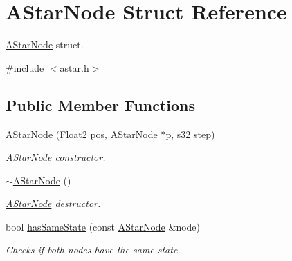 \hypertarget{struct_a_star_node}{}\section{A\+Star\+Node Struct Reference}
\label{struct_a_star_node}


\mbox{\hyperlink{struct_a_star_node}{A\+Star\+Node}} struct.  




{\ttfamily \#include $<$astar.\+h$>$}

\subsection*{Public Member Functions}
\begin{DoxyCompactItemize}
\item 
\mbox{\hyperlink{struct_a_star_node_a83855bd19999236fe103de45eed4fe35}{A\+Star\+Node}} (\mbox{\hyperlink{class_float2}{Float2}} pos, \mbox{\hyperlink{struct_a_star_node}{A\+Star\+Node}} $\ast$p, s32 step)
\begin{DoxyCompactList}\small\item\em \mbox{\hyperlink{struct_a_star_node}{A\+Star\+Node}} constructor. \end{DoxyCompactList}\item 
\mbox{\hyperlink{struct_a_star_node_a5d0ea0d3912a227675c5bc9d1deb2ca6}{$\sim$\+A\+Star\+Node}} ()
\begin{DoxyCompactList}\small\item\em \mbox{\hyperlink{struct_a_star_node}{A\+Star\+Node}} destructor. \end{DoxyCompactList}\item 
bool \mbox{\hyperlink{struct_a_star_node_a25645a980664aa05e56e4f06e433d9d3}{has\+Same\+State}} (const \mbox{\hyperlink{struct_a_star_node}{A\+Star\+Node}} \&node)
\begin{DoxyCompactList}\small\item\em Checks if both nodes have the same state. \end{DoxyCompactList}\end{DoxyCompactItemize}
